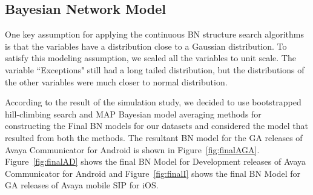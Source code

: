 \documentclass[smallextended]{svjour3}       %
\begin{document}
\begin{table}[ht]
\caption{Summary Result of LR model for ``Exceptions"}\label{t:LR1}
\centering
{}
\vspace{-10pt}
\end{table}


\subsection{Bayesian Network Model}
One key assumption for applying the continuous BN structure search algorithms 
is that the variables have a distribution close to a Gaussian distribution.
To satisfy this modeling assumption, we scaled all the
variables to unit scale. The variable ``Exceptions" still had a long
tailed distribution, but the distributions of the other variables
were much closer to normal distribution.

According to the result of the simulation study, we decided to use bootstrapped hill-climbing search and MAP Bayesian model averaging methods for constructing the Final BN models for our datasets and considered the model that resulted from both the methods. 
The resultant BN model for the GA releases of Avaya Communicator for Android is shown in Figure~\ref{fig:finalAGA}.  Figure~\ref{fig:finalAD} shows the final BN Model for Development releases of Avaya Communicator for Android and Figure~\ref{fig:finalI} shows the final BN Model for GA releases of Avaya mobile SIP for iOS.
\end{document}

